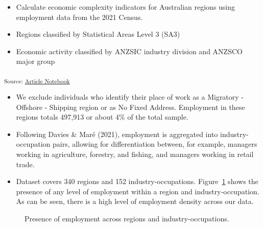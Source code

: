 \documentclass[
]{agujournal2019}
\begin{document}
\begin{itemize}
\item
  Calculate economic complexity indicators for Australian regions using
  employment data from the 2021 Census.
\item
  Regions classified by Statistical Areas Level 3 (SA3)
\item
  Economic activity classified by ANZSIC industry division and ANZSCO
  major group
\end{itemize}

\textsubscript{Source:
\href{https://aiti-flinders.github.io/sirp-complexity/index-preview.html}{Article
Notebook}}

\begin{itemize}
\item
  We exclude individuals who identify their place of work as a Migratory
  - Offshore - Shipping region or as No Fixed Address. Employment in
  these regions totals 497,913 or about 4\% of the total sample.
\item
  Following Davies \& Maré (2021), employment is aggregated into
  industry-occupation pairs, allowing for differentiation between, for
  example, managers working in agriculture, forestry, and fishing, and
  managers working in retail trade.
\item
  Dataset covers 340 regions and 152 industry-occupations.
  Figure~\ref{fig-employment-density} shows the presence of any level of
  employment within a region and industry-occupation. As can be seen,
  there is a high level of employment density across our data.
\end{itemize}

\label{cell-fig-employment-density}
\begin{figure}[H]


\caption{\label{fig-employment-density}Presence of employment across
regions and industry-occupations.}

\end{figure}%
\end{document}
